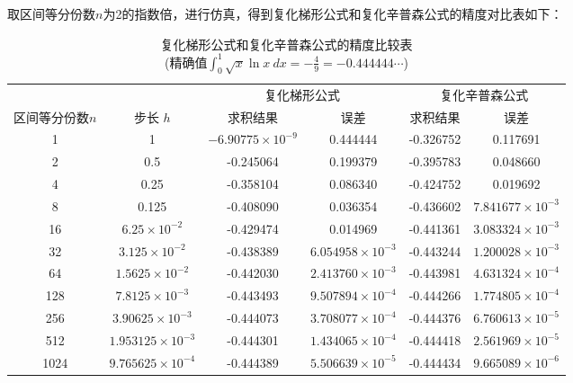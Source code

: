 取区间等分份数$n$为2的指数倍，进行仿真，得到复化梯形公式和复化辛普森公式的精度对比表如下：
\begin{table}[!hpt]
    \caption[梯形和辛普森求积结果对比]{复化梯形公式和复化辛普森公式的精度比较表\\(精确值$\int_{0}^{1} \sqrt{x} \ln x  \ dx = -\frac{4}{9}=-0.444444\cdots$)}
    \label{tab:tb_t_simpson}
    \centering
    \begin{tabular}{@{}cccccc@{}} \toprule
                      &         & \multicolumn{2}{c}{复化梯形公式} & \multicolumn{2}{c}{复化辛普森公式} \\ \cmidrule(r){3-4} \cmidrule(r){5-6}
        区间等分份数$n$ & 步长 $h$                   & 求积结果             & 误差                           & 求积结果 & 误差                    \\ \midrule
        1             & 1                         & $-6.90775\times10^{-9}$ & 0.444444  & -0.326752 & 0.117691 \\
        2             & 0.5                       & -0.245064 & 0.199379                & -0.395783 & 0.048660 \\
        4             & 0.25                      & -0.358104 & 0.086340                & -0.424752 & 0.019692 \\
        8             & 0.125                     & -0.408090 & 0.036354                & -0.436602 & $7.841677\times10^{-3}$\\
        16            & $6.25\times 10^{-2}$      & -0.429474 & 0.014969                & -0.441361 & $3.083324\times10^{-3}$\\
        32            & $3.125\times 10^{-2}$     & -0.438389 & $6.054958\times10^{-3}$ & -0.443244 & $1.200028\times10^{-3}$\\
        64            & $1.5625\times 10^{-2}$    & -0.442030 & $2.413760\times10^{-3}$ & -0.443981 & $4.631324\times10^{-4}$\\
        128           & $7.8125\times 10^{-3}$    & -0.443493 & $9.507894\times10^{-4}$ & -0.444266 & $1.774805\times10^{-4}$\\
        256           & $3.90625\times 10^{-3}$   & -0.444073 & $3.708077\times10^{-4}$ & -0.444376 & $6.760613\times10^{-5}$\\
        512           & $1.953125\times 10^{-3}$  & -0.444301 & $1.434065\times10^{-4}$ & -0.444418 & $2.561969\times10^{-5}$\\
        1024          & $9.765625\times 10^{-4}$  & -0.444389 & $5.506639\times10^{-5}$ & -0.444434 & $9.665089\times10^{-6}$\\
\bottomrule
    \end{tabular}
  \end{table}
